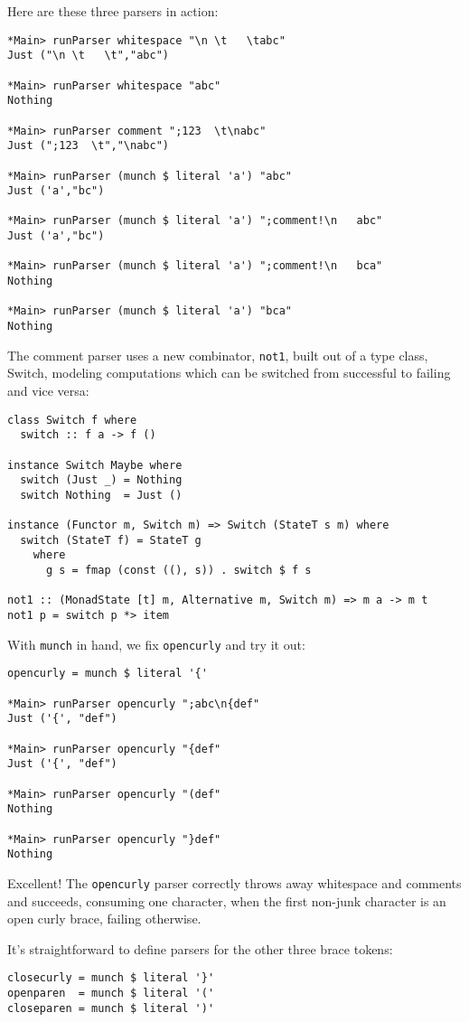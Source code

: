 \documentclass{tmr}
\begin{document}
Here are these three parsers in action:
\begin{verbatim}
*Main> runParser whitespace "\n \t   \tabc"
Just ("\n \t   \t","abc")

*Main> runParser whitespace "abc"
Nothing

*Main> runParser comment ";123  \t\nabc"
Just (";123  \t","\nabc")

*Main> runParser (munch $ literal 'a') "abc"
Just ('a',"bc")

*Main> runParser (munch $ literal 'a') ";comment!\n   abc"
Just ('a',"bc")

*Main> runParser (munch $ literal 'a') ";comment!\n   bca"
Nothing

*Main> runParser (munch $ literal 'a') "bca"
Nothing
\end{verbatim}

The comment parser uses a new combinator, \verb+not1+, built out of a 
type class, Switch, modeling computations which can be switched from
successful to failing and vice versa:
\begin{verbatim}
class Switch f where
  switch :: f a -> f ()

instance Switch Maybe where
  switch (Just _) = Nothing
  switch Nothing  = Just ()

instance (Functor m, Switch m) => Switch (StateT s m) where
  switch (StateT f) = StateT g
    where 
      g s = fmap (const ((), s)) . switch $ f s

not1 :: (MonadState [t] m, Alternative m, Switch m) => m a -> m t
not1 p = switch p *> item
\end{verbatim}

With \verb+munch+ in hand, we fix \verb+opencurly+ and try it out:
\begin{verbatim}
opencurly = munch $ literal '{'

*Main> runParser opencurly ";abc\n{def"
Just ('{', "def")

*Main> runParser opencurly "{def"
Just ('{', "def")

*Main> runParser opencurly "(def"
Nothing

*Main> runParser opencurly "}def"
Nothing
\end{verbatim}

Excellent!  The \verb+opencurly+ parser correctly throws away whitespace 
and comments and succeeds, consuming one character, when the first non-junk 
character is an open curly brace, failing otherwise.

It's straightforward to define parsers for the other three brace tokens:
\begin{verbatim}
closecurly = munch $ literal '}'
openparen  = munch $ literal '('
closeparen = munch $ literal ')'
\end{verbatim}
\end{document}
